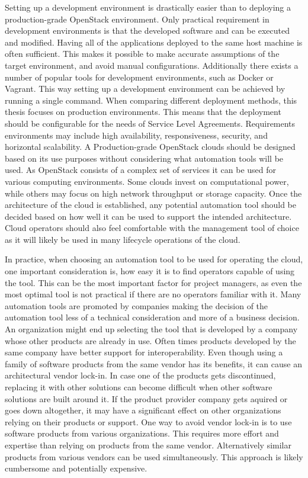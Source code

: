 Setting up a development environment is drastically easier than to deploying a
production-grade OpenStack environment. Only practical requirement in
development environments is that the developed software and can be executed and
modified. Having all of the applications deployed to the same host machine is
often sufficient. This makes it possible to make accurate assumptions of the
target environment, and avoid manual configurations. Additionally there exists
a number of popular tools for development environments, such as Docker
or Vagrant. This way setting up a development environment can be achieved by
running a single command. When comparing different deployment methods, this
thesis focuses on production environments. This means that the deployment
should be configurable for the needs of Service Level Agreements. Requirements
environments may include high availability, responsiveness, security, and
horizontal scalability. A Production-grade OpenStack clouds should be designed
based on its use purposes without considering what automation tools will be
used. As OpenStack consists of a complex set of services it can be used for
various computing environments. Some clouds invest on computational power,
while others may focus on high network throughput or storage capacity. Once the
architecture of the cloud is established, any potential automation tool should
be decided based on how well it can be used to support the intended
architecture. Cloud operators should also feel comfortable with the management
tool of choice as it will likely be used in many lifecycle operations of the
cloud.

In practice, when choosing an automation tool to be used for operating the
cloud, one important consideration is, how easy it is to find operators capable
of using the tool. This can be the most important factor for project managers,
as even the most optimal tool is not practical if there are no operators
familiar with it. Many automation tools are promoted by companies making the
decision of the automation tool less of a technical consideration and more of a
business decision. An organization might end up selecting the tool that is
developed by a company whose other products are already in use. Often times
products developed by the same company have better support for
interoperability. Even though using a family of software products from the same
vendor has its benefits, it can cause an architectural vendor lock-in. In case
one of the products gets discontinued, replacing it with other solutions can
become difficult when other software solutions are built around it. If the
product provider company gets aquired or goes down altogether, it may have a
significant effect on other organizations relying on their products or support.
One way to avoid vendor lock-in is to use software products from various
organizations. This requires more effort and expertise than relying on products
from the same vendor. Alternatively similar products from various vendors can
be used simultaneously. This approach is likely cumbersome and potentially
expensive.

